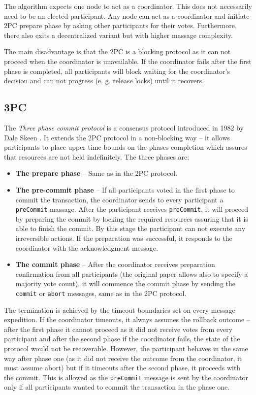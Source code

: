 \documentclass[oneside,
  digital, %
  table,   %
  nolof,     %
  nolot,     %
]{fithesis3}
\begin{document}
The algorithm expects one node to act as a coordinator. This does not necessarily need to be an elected participant. Any node can act as a coordinator and initiate 2PC prepare phase by asking other participants for their votes. Furthermore, there also exits a decentralized variant but with higher massage complexity.

The main disadvantage is that the 2PC is a blocking protocol as it can not proceed when the coordinator is unavailable. If the coordinator fails after the first phase is completed, all participants will block waiting for the coordinator's decision and can not progress (e. g. release locks) until it recovers.

\subsection{3PC}

The \textit{Three phase commit protocol} is a consensus protocol introduced in 1982 by Dale Skeen \cite{3PC}. It extends the 2PC protocol in a non-blocking way -- it allows participants to place upper time bounds on the phases completion which assures that resources are not  held indefinitely. The three phases are:

\begin{itemize}
    \item \textbf{The prepare phase} -- Same as in the 2PC protocol.
    
    \item \textbf{The pre-commit phase} -- If all participants voted in the first phase to commit the transaction, the coordinator sends to every participant a \texttt{preCommit} massage. After the participant receives \texttt{preCommit}, it will proceed by preparing the commit by locking the required resources assuring that it is able to finish the commit. By this stage the participant can not execute any irreversible actions. If the preparation was successful, it responds to the coordinator with the acknowledgment message.
    
    \item \textbf{The commit phase} -- After the coordinator receives preparation confirmation from all participants (the original paper \cite{3PC} allows also to specify a majority vote count), it will commence the commit phase by sending the \texttt{commit} or \texttt{abort} messages, same as in the 2PC protocol.
\end{itemize}

The termination is achieved by the timeout boundaries set on every message expedition. If the coordinator timeouts, it always assumes the rollback outcome -- after the first phase it cannot proceed as it did not receive votes from every participant and after the second phase if the coordinator fails, the state of the protocol would not be recoverable. However, the participant behaves in the same way after phase one (as it did not receive the outcome from the coordinator, it must assume abort) but if it timeouts after the second phase, it proceeds with the commit. This is allowed as the \texttt{preCommit} message is sent by the coordinator only if all participants wanted to commit the transaction in the phase one.
\end{document}
